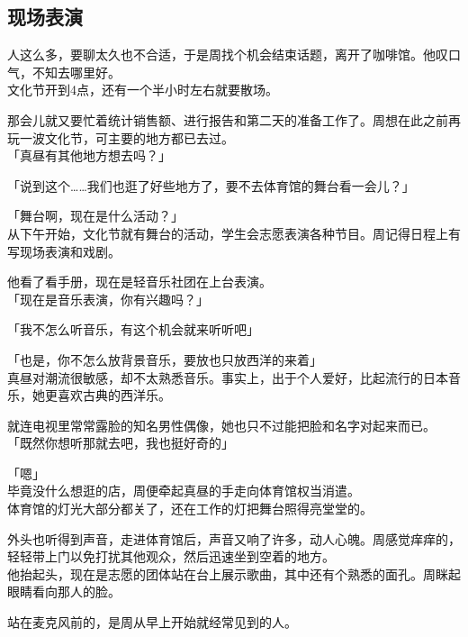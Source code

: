 \subsection{现场表演}

人这么多，要聊太久也不合适，于是周找个机会结束话题，离开了咖啡馆。他叹口气，不知去哪里好。\\

文化节开到4点，还有一个半小时左右就要散场。

那会儿就又要忙着统计销售额、进行报告和第二天的准备工作了。周想在此之前再玩一波文化节，可主要的地方都已去过。\\

「真昼有其他地方想去吗？」

「说到这个……我们也逛了好些地方了，要不去体育馆的舞台看一会儿？」

「舞台啊，现在是什么活动？」\\

从下午开始，文化节就有舞台的活动，学生会志愿表演各种节目。周记得日程上有写现场表演和戏剧。

他看了看手册，现在是轻音乐社团在上台表演。\\

「现在是音乐表演，你有兴趣吗？」

「我不怎么听音乐，有这个机会就来听听吧」

「也是，你不怎么放背景音乐，要放也只放西洋的来着」\\

真昼对潮流很敏感，却不太熟悉音乐。事实上，出于个人爱好，比起流行的日本音乐，她更喜欢古典的西洋乐。

就连电视里常常露脸的知名男性偶像，她也只不过能把脸和名字对起来而已。\\

「既然你想听那就去吧，我也挺好奇的」

「嗯」\\

毕竟没什么想逛的店，周便牵起真昼的手走向体育馆权当消遣。\\

体育馆的灯光大部分都关了，还在工作的灯把舞台照得亮堂堂的。

外头也听得到声音，走进体育馆后，声音又响了许多，动人心魄。周感觉痒痒的，轻轻带上门以免打扰其他观众，然后迅速坐到空着的地方。\\

他抬起头，现在是志愿的团体站在台上展示歌曲，其中还有个熟悉的面孔。周眯起眼睛看向那人的脸。

站在麦克风前的，是周从早上开始就经常见到的人。\\

